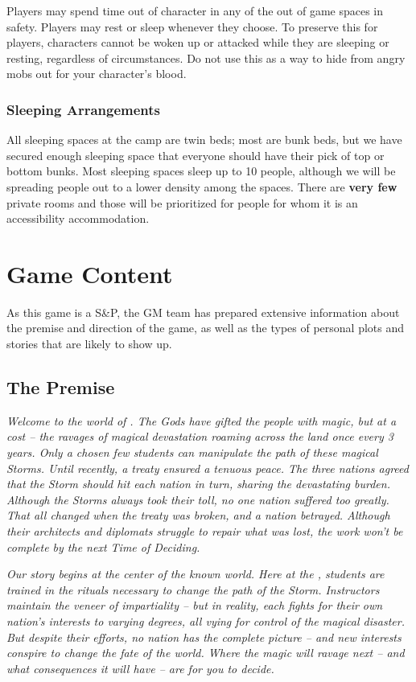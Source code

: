 \documentclass[sheet]{GL2020}
\begin{document}
Players may spend time out of character in any of the out of game spaces in safety. Players may rest or sleep whenever they choose. To preserve this for players, characters cannot be woken up or attacked while they are sleeping or resting, regardless of circumstances. Do not use this as a way to hide from angry mobs out for your character’s blood.

\subsubsection{Sleeping Arrangements}
All sleeping spaces at the camp are twin beds; most are bunk beds, but we have secured enough sleeping space that everyone should have their pick of top or bottom bunks. Most sleeping spaces sleep up to 10 people, although we will be spreading people out to a lower density among the spaces. There are \textbf{very few} private rooms and those will be prioritized for people for whom it is an accessibility accommodation.

\section{Game Content}
As this game is a S\&P, the GM team has prepared extensive information about the premise and direction of the game, as well as the types of personal plots and stories that are likely to show up.

\subsection{The Premise}
\emph{Welcome to the world of \pEarth{}. The Gods have gifted the people with magic, but at a cost -- the ravages of magical devastation roaming across the land once every 3 years. Only a chosen few students can manipulate the path of these magical Storms. Until recently, a treaty ensured a tenuous peace. The three nations agreed that the Storm should hit each nation in turn, sharing the devastating burden. Although the Storms always took their toll, no one nation suffered too greatly. That all changed when the treaty was broken, and a nation betrayed. Although their architects and diplomats struggle to repair what was lost, the work won’t be complete by the next Time of Deciding.}

\emph{Our story begins at the center of the known world. Here at the \pSchool{}, students are trained in the rituals necessary to change the path of the Storm. Instructors maintain the veneer of impartiality -- but in reality, each fights for their own nation’s interests to varying degrees, all vying for control of the magical disaster. But despite their efforts, no nation has the complete picture -- and new interests conspire to change the fate of the world. Where the magic will ravage next -- and what consequences it will have -- are for you to decide.}
\end{document}
